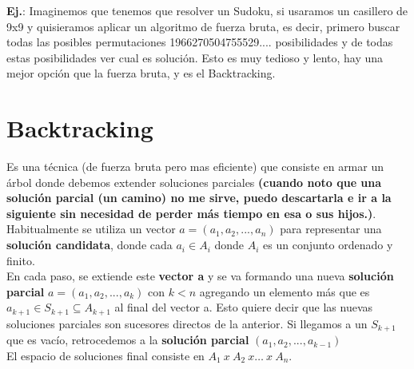 \documentclass[10pt,a4paper]{article}
\begin{document}
\textbf{Ej.}: Imaginemos que tenemos que resolver un Sudoku, si usaramos un casillero de 9x9 y quisieramos aplicar un algoritmo de fuerza bruta, es decir, primero buscar todas las posibles permutaciones 1966270504755529.... posibilidades y de todas estas posibilidades ver cual es solución. Esto es muy tedioso y lento, hay una mejor opción que la fuerza bruta, y es el Backtracking.
\section*{Backtracking}
Es una técnica (de fuerza bruta pero mas eficiente) que consiste en armar un árbol donde debemos extender soluciones parciales \textbf{(cuando noto que una solución parcial (un camino) no me sirve, puedo descartarla e ir a la siguiente sin necesidad de perder más tiempo en esa o sus hijos.)}. \\

Habitualmente se utiliza un vector $ a = (a_{1}, a_{2}, ..., a_{n})$ para representar una \textbf{solución candidata}, donde cada $a_{i} \in A_{i}$ donde $A_{i}$ es un conjunto ordenado y finito. \\ 
En cada paso, se extiende este \textbf{vector a} y se va formando una nueva \textbf{solución parcial} $a = (a_{1}, a_{2}, ..., a_{k})$ con $k<n$  agregando un elemento más que es $a_{k+1} \in S_{k+1} \subseteq A_{k+1}$ al final del vector a. Esto quiere decir que las nuevas soluciones parciales son sucesores directos de la anterior. Si llegamos a un $S_{k+1}$ que es vacío, retrocedemos a la \textbf{solución parcial }$(a_{1}, a_{2}, ..., a_{k-1})$ \\

El espacio de soluciones final consiste en $ A_{1} \ x \ A_{2} \ x \dots \ x \ A_{n} $. \\
\end{document}
